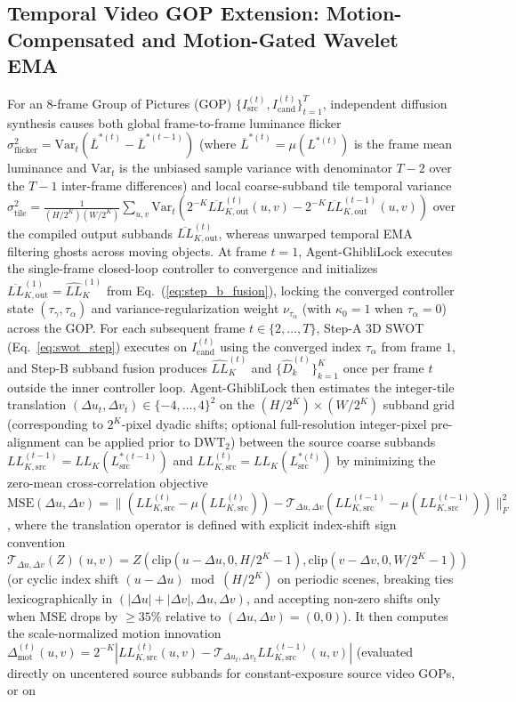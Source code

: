 \documentclass[conference,10pt]{IEEEtran}
\begin{document}
\subsection{Temporal Video GOP Extension: Motion-Compensated and Motion-Gated Wavelet EMA}
For an 8-frame Group of Pictures (GOP) $\{I_{\text{src}}^{(t)}, I_{\text{cand}}^{(t)}\}_{t=1}^T$, independent diffusion synthesis causes both global frame-to-frame luminance flicker $\sigma^2_{\text{flicker}} = \mathrm{Var}_t(\overline{L}^{*(t)} - \overline{L}^{*(t-1)})$ (where $\overline{L}^{*(t)} = \mu(L^{*(t)})$ is the frame mean luminance and $\mathrm{Var}_t$ is the unbiased sample variance with denominator $T-2$ over the $T-1$ inter-frame differences) and local coarse-subband tile temporal variance $\sigma^2_{\text{tile}} = \frac{1}{(H/2^K)(W/2^K)}\sum_{u,v} \mathrm{Var}_t(2^{-K}\overline{LL}_{K,\text{out}}^{(t)}(u,v) - 2^{-K}\overline{LL}_{K,\text{out}}^{(t-1)}(u,v))$ over the compiled output subbands $\overline{LL}_{K,\text{out}}^{(t)}$, whereas unwarped temporal EMA filtering ghosts across moving objects. At frame $t=1$, Agent-GhibliLock executes the single-frame closed-loop controller to convergence and initializes $\overline{LL}_{K,\text{out}}^{(1)} = \widehat{LL}_K^{(1)}$ from Eq.~(\ref{eq:step_b_fusion}), locking the converged controller state $(\tau_\gamma, \tau_\alpha)$ and variance-regularization weight $\nu_{\tau_\alpha}$ (with $\kappa_0 = 1$ when $\tau_\alpha = 0$) across the GOP. For each subsequent frame $t \in \{2, \dots, T\}$, Step-A 3D SWOT (Eq.~\ref{eq:swot_step}) executes on $I_{\text{cand}}^{(t)}$ using the converged index $\tau_\alpha$ from frame $1$, and Step-B subband fusion produces $\widehat{LL}_K^{(t)}$ and $\{\widehat{D}_k^{(t)}\}_{k=1}^K$ once per frame $t$ outside the inner controller loop. Agent-GhibliLock then estimates the integer-tile translation $(\Delta u_t, \Delta v_t) \in \{-4, \dots, 4\}^2$ on the $(H/2^K)\times(W/2^K)$ subband grid (corresponding to $2^K$-pixel dyadic shifts; optional full-resolution integer-pixel pre-alignment can be applied prior to $\mathrm{DWT}_2$) between the source coarse subbands $LL_{K,\text{src}}^{(t-1)} = LL_K(L^{*(t-1)}_{\text{src}})$ and $LL_{K,\text{src}}^{(t)} = LL_K(L^{*(t)}_{\text{src}})$ by minimizing the zero-mean cross-correlation objective $\mathrm{MSE}(\Delta u, \Delta v) = \|(LL_{K,\text{src}}^{(t)} - \mu(LL_{K,\text{src}}^{(t)})) - \mathcal{T}_{\Delta u, \Delta v}(LL_{K,\text{src}}^{(t-1)} - \mu(LL_{K,\text{src}}^{(t-1)}))\|_F^2$, where the translation operator is defined with explicit index-shift sign convention $\mathcal{T}_{\Delta u, \Delta v}(Z)(u,v) = Z(\mathrm{clip}(u - \Delta u, 0, H/2^K - 1), \mathrm{clip}(v - \Delta v, 0, W/2^K - 1))$ (or cyclic index shift $(u - \Delta u) \bmod (H/2^K)$ on periodic scenes, breaking ties lexicographically in $(|\Delta u|+|\Delta v|, \Delta u, \Delta v)$, and accepting non-zero shifts only when MSE drops by $\ge 35\%$ relative to $(\Delta u, \Delta v) = (0,0)$). It then computes the scale-normalized motion innovation $\Delta_{\text{mot}}^{(t)}(u,v) = 2^{-K} |LL_{K,\text{src}}^{(t)}(u,v) - \mathcal{T}_{\Delta u_t, \Delta v_t} LL_{K,\text{src}}^{(t-1)}(u,v)|$ (evaluated directly on uncentered source subbands for constant-exposure source video GOPs, or on 
\end{document}
